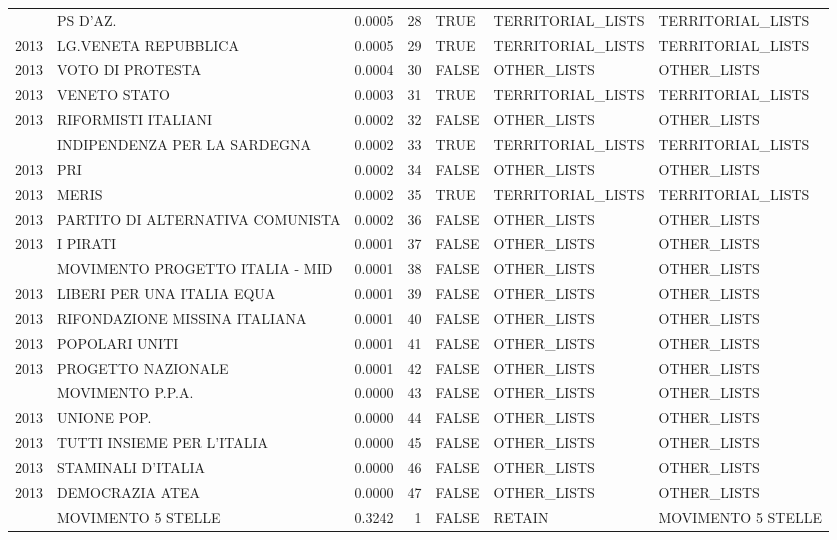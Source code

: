 \begin{longtable}[t]{rlrrlll}
\addlinespace
2013 & PS D'AZ. & 0.0005 & 28 & TRUE & TERRITORIAL\_LISTS & TERRITORIAL\_LISTS\\
2013 & LG.VENETA REPUBBLICA & 0.0005 & 29 & TRUE & TERRITORIAL\_LISTS & TERRITORIAL\_LISTS\\
2013 & VOTO DI PROTESTA & 0.0004 & 30 & FALSE & OTHER\_LISTS & OTHER\_LISTS\\
2013 & VENETO STATO & 0.0003 & 31 & TRUE & TERRITORIAL\_LISTS & TERRITORIAL\_LISTS\\
2013 & RIFORMISTI ITALIANI & 0.0002 & 32 & FALSE & OTHER\_LISTS & OTHER\_LISTS\\
\addlinespace
2013 & INDIPENDENZA PER LA SARDEGNA & 0.0002 & 33 & TRUE & TERRITORIAL\_LISTS & TERRITORIAL\_LISTS\\
2013 & PRI & 0.0002 & 34 & FALSE & OTHER\_LISTS & OTHER\_LISTS\\
2013 & MERIS & 0.0002 & 35 & TRUE & TERRITORIAL\_LISTS & TERRITORIAL\_LISTS\\
2013 & PARTITO DI ALTERNATIVA COMUNISTA & 0.0002 & 36 & FALSE & OTHER\_LISTS & OTHER\_LISTS\\
2013 & I PIRATI & 0.0001 & 37 & FALSE & OTHER\_LISTS & OTHER\_LISTS\\
\addlinespace
2013 & MOVIMENTO PROGETTO ITALIA - MID & 0.0001 & 38 & FALSE & OTHER\_LISTS & OTHER\_LISTS\\
2013 & LIBERI PER UNA ITALIA EQUA & 0.0001 & 39 & FALSE & OTHER\_LISTS & OTHER\_LISTS\\
2013 & RIFONDAZIONE MISSINA ITALIANA & 0.0001 & 40 & FALSE & OTHER\_LISTS & OTHER\_LISTS\\
2013 & POPOLARI UNITI & 0.0001 & 41 & FALSE & OTHER\_LISTS & OTHER\_LISTS\\
2013 & PROGETTO NAZIONALE & 0.0001 & 42 & FALSE & OTHER\_LISTS & OTHER\_LISTS\\
\addlinespace
2013 & MOVIMENTO P.P.A. & 0.0000 & 43 & FALSE & OTHER\_LISTS & OTHER\_LISTS\\
2013 & UNIONE POP. & 0.0000 & 44 & FALSE & OTHER\_LISTS & OTHER\_LISTS\\
2013 & TUTTI INSIEME PER L'ITALIA & 0.0000 & 45 & FALSE & OTHER\_LISTS & OTHER\_LISTS\\
2013 & STAMINALI D'ITALIA & 0.0000 & 46 & FALSE & OTHER\_LISTS & OTHER\_LISTS\\
2013 & DEMOCRAZIA ATEA & 0.0000 & 47 & FALSE & OTHER\_LISTS & OTHER\_LISTS\\
\addlinespace
2018 & MOVIMENTO 5 STELLE & 0.3242 & 1 & FALSE & RETAIN & MOVIMENTO 5 STELLE\\

\end{longtable}
